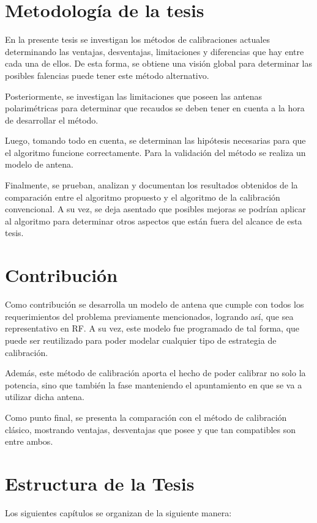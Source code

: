 \section{Metodología de la tesis}
En la presente tesis se investigan los métodos de calibraciones actuales determinando las ventajas, desventajas, 
limitaciones y diferencias que hay entre cada una de ellos. De esta forma, se obtiene una visión global para 
determinar las posibles falencias puede tener este método alternativo.

Posteriormente, se investigan las limitaciones que poseen las antenas polarimétricas para determinar que recaudos 
se deben tener en cuenta a la hora de desarrollar el método.

Luego, tomando todo en cuenta, se determinan las hipótesis necesarias para que el algoritmo funcione correctamente. Para 
la validación del método se realiza un modelo de antena.

Finalmente, se prueban, analizan y documentan los resultados obtenidos de la comparación entre el algoritmo propuesto 
y el algoritmo de la calibración convencional. A su vez, se deja asentado que posibles mejoras se podrían aplicar al 
algoritmo para determinar otros aspectos que están fuera del alcance de esta tesis.

\section{Contribución}

Como contribución se desarrolla un modelo de antena que cumple con todos los requerimientos del problema previamente 
mencionados, logrando así, que sea representativo en RF. A su vez, este modelo fue programado de tal forma, que puede
ser reutilizado para poder modelar cualquier tipo de estrategia de calibración.

Además, este método de calibración aporta el hecho de poder calibrar no solo la potencia, sino que también la fase 
manteniendo el apuntamiento en que se va a utilizar dicha antena.

Como punto final, se presenta la comparación con el método de calibración clásico, mostrando ventajas, desventajas 
que posee y que tan compatibles son entre ambos.


\section{Estructura de la Tesis}

Los siguientes capítulos se organizan de la siguiente manera: 

